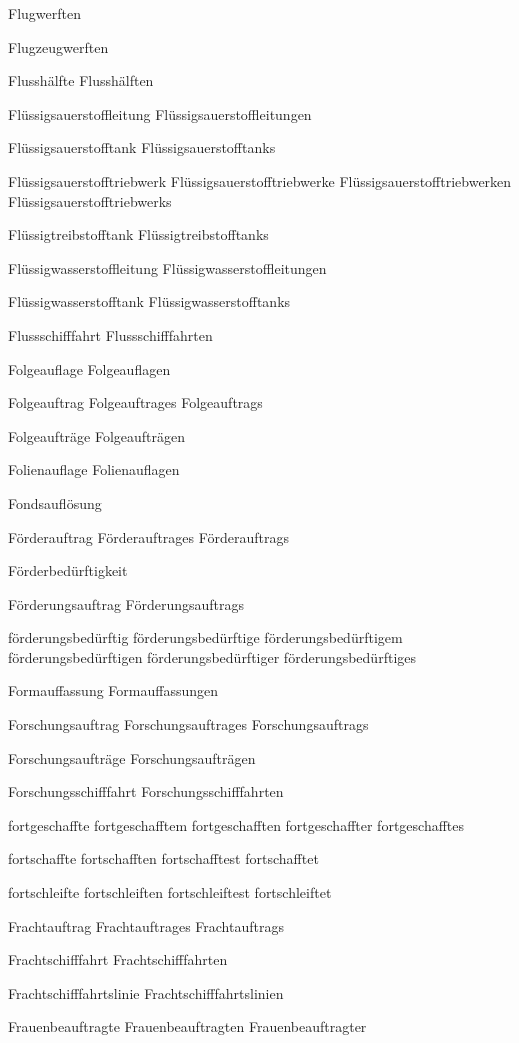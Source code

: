 Flugwerften

Flugzeugwerften

Flusshälfte
Flusshälften

Flüssigsauerstoffleitung
Flüssigsauerstoffleitungen

Flüssigsauerstofftank
Flüssigsauerstofftanks

Flüssigsauerstofftriebwerk
Flüssigsauerstofftriebwerke
Flüssigsauerstofftriebwerken
Flüssigsauerstofftriebwerks

Flüssigtreibstofftank
Flüssigtreibstofftanks

Flüssigwasserstoffleitung
Flüssigwasserstoffleitungen

Flüssigwasserstofftank
Flüssigwasserstofftanks

Flussschifffahrt
Flussschifffahrten

Folgeauflage
Folgeauflagen

Folgeauftrag
Folgeauftrages
Folgeauftrags

Folgeaufträge
Folgeaufträgen

Folienauflage
Folienauflagen

Fondsauflösung

Förderauftrag
Förderauftrages
Förderauftrags

Förderbedürftigkeit

Förderungsauftrag
Förderungsauftrags

förderungsbedürftig
förderungsbedürftige
förderungsbedürftigem
förderungsbedürftigen
förderungsbedürftiger
förderungsbedürftiges

Formauffassung
Formauffassungen

Forschungsauftrag
Forschungsauftrages
Forschungsauftrags

Forschungsaufträge
Forschungsaufträgen

Forschungsschifffahrt
Forschungsschifffahrten

fortgeschaffte
fortgeschafftem
fortgeschafften
fortgeschaffter
fortgeschafftes

fortschaffte
fortschafften
fortschafftest
fortschafftet

fortschleifte
fortschleiften
fortschleiftest
fortschleiftet

Frachtauftrag
Frachtauftrages
Frachtauftrags

Frachtschifffahrt
Frachtschifffahrten

Frachtschifffahrtslinie
Frachtschifffahrtslinien

Frauenbeauftragte
Frauenbeauftragten
Frauenbeauftragter

